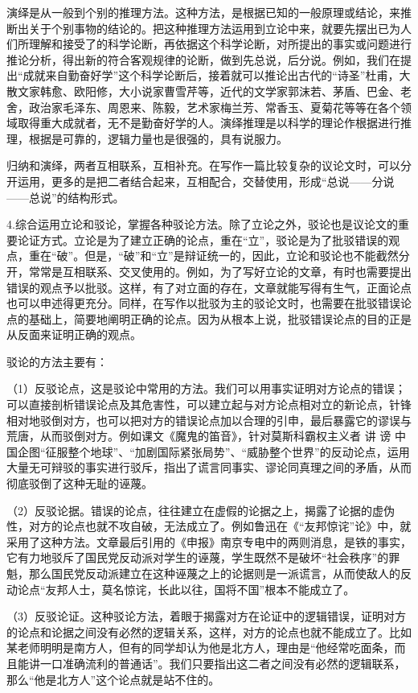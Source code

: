 演绎是从一般到个别的推理方法。这种方法，是根据已知的一般原理或结论，来推断出关于个别事物的结论的。把这种推理方法运用到立论中来，就要先摆出已为人们所理解和接受了的科学论断，再依据这个科学论断，对所提出的事实或问题进行推论分析，得出新的符合客观规律的论断，做到先总说，后分说。例如，我们在提出“成就来自勤奋好学”这个科学论断后，接着就可以推论出古代的“诗圣”杜甫，大散文家韩愈、欧阳修，大小说家曹雪芹等，近代的文学家郭沫若、茅盾、巴金、老舍，政治家毛泽东、周恩来、陈毅，艺术家梅兰芳、常香玉、夏菊花等等在各个领域取得重大成就者，无不是勤奋好学的人。演绎推理是以科学的理论作根据进行推理，根据是可靠的，逻辑力量也是很强的，具有说服力。

归纳和演绎，两者互相联系，互相补充。在写作一篇比较复杂的议论文时，可以分开运用，更多的是把二者结合起来，互相配合，交替使用，形成“总说——分说——总说”的结构形式。

4.综合运用立论和驳论，掌握各种驳论方法。除了立论之外，驳论也是议论文的重要论证方式。立论是为了建立正确的论点，重在“立”，驳论是为了批驳错误的观点，重在“破”。但是，“破”和“立”是辩证统一的，因此，立论和驳论也不能截然分开，常常是互相联系、交叉使用的。例如，为了写好立论的文章，有时也需要提出错误的观点予以批驳。这样，有了对立面的存在，文章就能写得有生气，正面论点也可以申述得更充分。同样，在写作以批驳为主的驳论文时，也需要在批驳错误论点的基础上，简要地阐明正确的论点。因为从根本上说，批驳错误论点的目的正是从反面来证明正确的观点。

驳论的方法主要有：

（1）反驳论点，这是驳论中常用的方法。我们可以用事实证明对方论点的错误；可以直接剖析错误论点及其危害性，可以建立起与对方论点相对立的新论点，针锋相对地驳倒对方，也可以把对方的错误论点加以合理的引申，最后暴露它的谬误与荒唐，从而驳倒对方。例如课文《魔鬼的笛音》，针对莫斯科霸权主义者 讲 谤 中国企图“征服整个地球”、“加剧国际紧张局势”、“威胁整个世界”的反动论点，运用大量无可辩驳的事实进行驳斥，指出了谎言同事实、谬论同真理之间的矛盾，从而彻底驳倒了这种无耻的诬蔑。

（2）反驳论据。错误的论点，往往建立在虚假的论据之上，揭露了论据的虚伪性，对方的论点也就不攻自破，无法成立了。例如鲁迅在《“友邦惊诧”论》中，就采用了这种方法。文章最后引用的《申报》南京专电中的两则消息，是铁的事实，它有力地驳斥了国民党反动派对学生的诬蔑，学生既然不是破坏“社会秩序”的罪魁，那么国民党反动派建立在这种诬蔑之上的论据则是一派谎言，从而使敌人的反动论点“友邦人士，莫名惊诧，长此以往，国将不国”根本不能成立了。

（3）反驳论证。这种驳论方法，着眼于揭露对方在论证中的逻辑错误，证明对方的论点和论据之间没有必然的逻辑关系，这样，对方的论点也就不能成立了。比如某老师明明是南方人，但有的同学却认为他是北方人，理由是“他经常吃面条，而且能讲一口准确流利的普通话”。我们只要指出这二者之间没有必然的逻辑联系，那么“他是北方人”这个论点就是站不住的。

